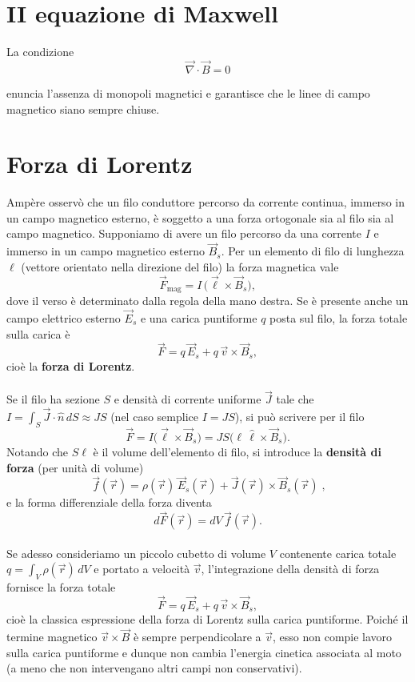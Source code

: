 \documentclass{book}
\begin{document}
\section{II equazione di Maxwell }

La condizione
$$
\vec{\nabla}\cdot\vec B=0
$$

enuncia l'assenza di monopoli magnetici e garantisce che le linee di campo magnetico siano sempre chiuse. 
\section{Forza di Lorentz}

Ampère osservò che un filo conduttore percorso da corrente continua, immerso in un campo magnetico esterno, è soggetto a una forza ortogonale sia al filo sia al campo magnetico. Supponiamo di avere un filo percorso da una corrente $I$ e immerso in un campo magnetico esterno $\vec{B}_s$. Per un elemento di filo di lunghezza $\ell$ (vettore orientato nella direzione del filo) la forza magnetica vale
\[
\vec{F}_\text{mag} = I \, \bigl(\vec{\ell}\times\vec{B}_s\bigr),
\]
dove il verso è determinato dalla regola della mano destra. Se è presente anche un campo elettrico esterno $\vec{E}_s$ e una carica puntiforme $q$ posta sul filo, la forza totale sulla carica è
\[
\vec{F} = q\,\vec{E}_s + q\,\vec{v}\times\vec{B}_s,
\]
cioè la \textbf{forza di Lorentz}.
\\
\\
Se il filo ha sezione $S$ e densità di corrente uniforme $\vec{J}$ tale che $I=\int_S \vec{J}\cdot\hat{n}\,dS \approx J S$ (nel caso semplice $I=J S$), si può scrivere per il filo
\[
\vec{F} = I\bigl(\vec{\ell}\times\vec{B}_s\bigr) = J S \bigl(\ell \,\hat{\ell}\times\vec{B}_s\bigr).
\]
Notando che $S\ell$ è il volume dell'elemento di filo, si introduce la \textbf{densità di forza} (per unità di volume)
\[
\boxed{\;\vec{f}(\vec{r}) = \rho(\vec{r})\,\vec{E}_s(\vec{r}) + \vec{J}(\vec{r})\times\vec{B}_s(\vec{r})\;},
\]
e la forma differenziale della forza diventa
\[
d\vec{F}(\vec{r}) = dV\,\vec{f}(\vec{r}).
\]
\\
Se adesso consideriamo un piccolo cubetto di volume $V$ contenente carica totale $q = \int_V \rho(\vec{r})\,dV$ e portato a velocità $\vec{v}$, l'integrazione della densità di forza fornisce la forza totale
\[
\vec{F} = q\,\vec{E}_s + q\,\vec{v}\times\vec{B}_s,
\]
cioè la classica espressione della forza di Lorentz sulla carica puntiforme. Poiché il termine magnetico $\vec{v}\times\vec{B}$ è sempre perpendicolare a $\vec{v}$, esso non compie lavoro sulla carica puntiforme e dunque non cambia l'energia cinetica associata al moto (a meno che non intervengano altri campi non conservativi).
\end{document}
